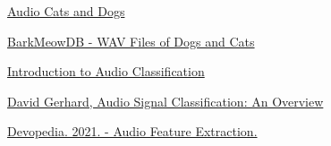 \documentclass[12pt a4paper]{article}
\numberwithin{equation}{section}
\begin{document}
\begin{thebibliography}{2}
 \href{https://www.kaggle.com/mmoreaux/audio-cats-and-dogs}{Audio Cats and Dogs}

 \href{https://zenodo.org/record/3563990#.YZ99xtDMK3B}{BarkMeowDB - WAV Files of Dogs and Cats}

 \href{https://www.analyticsvidhya.com/blog/2021/06/introduction-to-audio-classification/}{Introduction to Audio Classification}

 \href{http://www2.cs.uregina.ca/~gerhard/publications/CAI00.pdf}{David Gerhard, Audio Signal Classification: An Overview}

 \href{https://devopedia.org/audio-feature-extraction}{Devopedia. 2021. - Audio Feature Extraction.}

\end{thebibliography}
\end{document}
